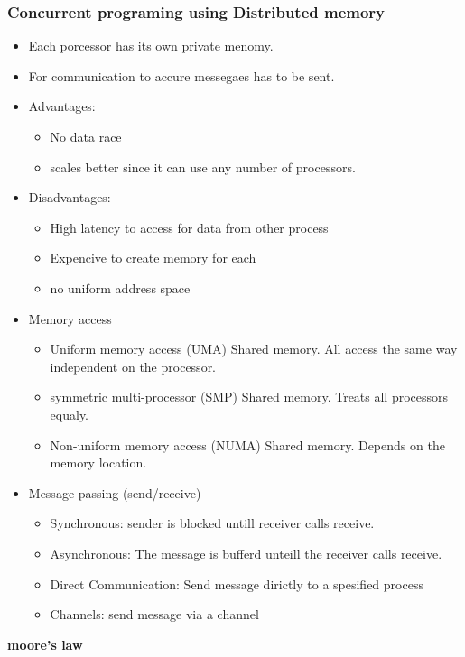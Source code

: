 \subsubsection{Concurrent programing using Distributed memory}
\begin{itemize}
\item Each porcessor has its own private menomy.
\item For communication to accure messegaes has to be sent.
\item Advantages:
  \begin{itemize}
  \item No data race
  \item scales better since it can use any number of processors.
  \end{itemize}
\item Disadvantages:
  \begin{itemize}
  \item High latency to access for data from other process
  \item Expencive to create memory for each 
  \item no uniform address space
  \end{itemize}
\item Memory access
  \begin{itemize}
  \item Uniform memory access (UMA) Shared memory. All access the same way independent on the processor.
  \item symmetric multi-processor (SMP) Shared memory. Treats all processors equaly.
  \item Non-uniform memory access (NUMA) Shared memory. Depends on the memory location.
  \end{itemize}
\item Message passing (send/receive)
  \begin{itemize}
  \item Synchronous: sender is blocked untill receiver calls receive.
  \item Asynchronous: The message is bufferd unteill the receiver calls receive.
  \item Direct Communication: Send message dirictly to a spesified process
  \item Channels: send message via a channel
  \end{itemize}
\end{itemize}

\textbf{moore's law}

